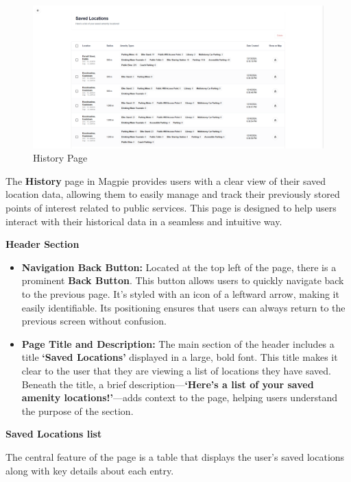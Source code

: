 \begin{figure}[h]
    \centering{}
    \includegraphics[width=1\textwidth]{images/site/history/history_page.png}
    \caption{History Page}
\end{figure}

The \textbf{History} page in Magpie provides users with a clear view of their saved location data, allowing them to easily manage and track their previously stored points of interest related to public services. This page is designed to help users interact with their historical data in a seamless and intuitive way.

\textbf{Header Section}
\begin{itemize}
    \item{} \textbf{Navigation Back Button:} Located at the top left of the page, there is a prominent \textbf{Back Button}. This button allows users to quickly navigate back to the previous page. It’s styled with an icon of a leftward arrow, making it easily identifiable. Its positioning ensures that users can always return to the previous screen without confusion.
    \item{} \textbf{Page Title and Description:} The main section of the header includes a title \textbf{`Saved Locations'} displayed in a large, bold font. This title makes it clear to the user that they are viewing a list of locations they have saved. Beneath the title, a brief description—\textbf{`Here's a list of your saved amenity locations!'}—adds context to the page, helping users understand the purpose of the section.
\end{itemize}

\textbf{Saved Locations list}

The central feature of the page is a table that displays the user's saved locations along with key details about each entry.

